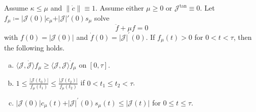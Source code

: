 \begin{theorem}
	Assume \(\kappa \leq \mu \) and \(\lVert \dot{c} \rVert \equiv 1\). Assume either \(\mu \geq 0\) or \(\mathcal{J} ^{\text{tan} } \equiv 0\). Let \(f_\mu \coloneqq \vert \mathcal{J} (0) \vert c_\mu + \vert \mathcal{J} \vert '(0) s_\mu \) solve
	\[
		\ddot{f} + \mu f = 0
	\]
	with \(f(0) = \vert \mathcal{J} (0) \vert \) and \(\dot{f} (0) = \vert \mathcal{J} \vert ^{\prime} (0)\). If \(f_\mu (t)> 0\) for \(0 < t < \tau \), then the following holds.
	\begin{enumerate}[(a)]
		\item \(\langle \mathcal{J} , \dot{\mathcal{J} }  \rangle f_\mu \geq \langle \mathcal{J} , \mathcal{J}  \rangle \dot{f} _\mu\) on \([0, \tau ]\).
		\item \(1 \leq \frac{\vert \mathcal{J} (t_0) \vert }{f_\mu (t_1)} \leq \frac{\vert \mathcal{J} (t_2) \vert }{f_\mu (t_2)}\) if \(0 < t_1 \leq t_2 < \tau \).
		\item \(\vert \mathcal{J} (0) \vert c_\mu (t) + \vert \mathcal{J}  \vert ^{\prime} (0) s_\mu (t) \leq \vert \mathcal{J} (t) \vert\) for \(0 \leq t \leq \tau \).
	\end{enumerate}
\end{theorem}
